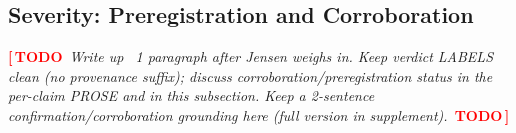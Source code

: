 \documentclass{article}
\newcommand{\TODO}[1]{\par\smallskip\noindent\textcolor{red}{\textbf{[\,TODO}}\ \textit{\textcolor{black!65}{#1}}\ \textcolor{red}{\textbf{TODO\,]}}\par\smallskip}
\begin{document}
\subsection{Severity: Preregistration and Corroboration}
\label{sec:severity}
\TODO{Write up ~1 paragraph after Jensen weighs in. Keep verdict LABELS clean (no provenance
suffix); discuss corroboration/preregistration status in the per-claim PROSE and in this
subsection. Keep a 2-sentence confirmation/corroboration grounding here (full version in supplement).}
\end{document}
